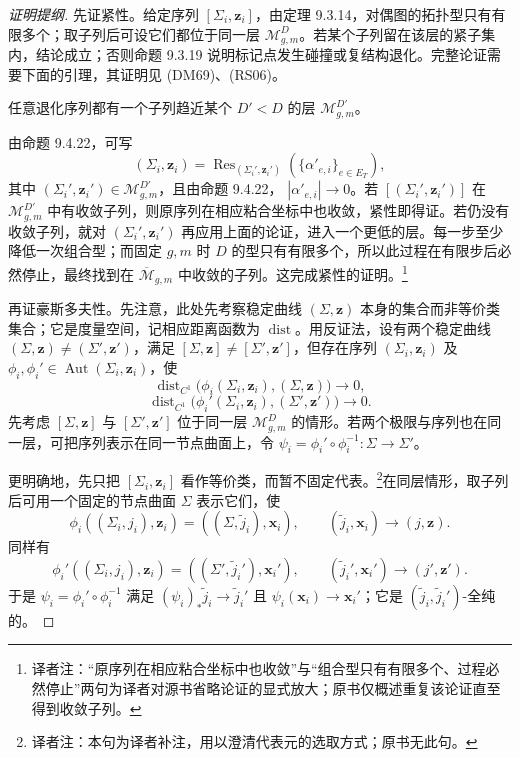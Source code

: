 \begin{proof}[证明提纲]
先证紧性。给定序列 $[\Sigma_i,\boldsymbol z_i]$，由定理 9.3.14，对偶图的拓扑型只有有限多个；取子列后可设它们都位于同一层
$\mathcal M_{g,m}^D$。若某个子列留在该层的紧子集内，结论成立；否则命题 9.3.19 说明标记点发生碰撞或复结构退化。完整论证需要下面的引理，其证明见 (DM69)、(RS06)。

\begin{lemma}\label{lem:degeneration-approaches-lower-stratum}
任意退化序列都有一个子列趋近某个 $D'<D$ 的层
$\mathcal M_{g,m}^{D'}$。
\end{lemma}

由命题 9.4.22，可写
\[
 (\Sigma_i,\boldsymbol z_i)=
 \operatorname{Res}_{(\Sigma_i',\boldsymbol z_i')}
 (\{\alpha'_{e,i}\}_{e\in E_T}),
\]
其中 $(\Sigma_i',\boldsymbol z_i')\in\mathcal M_{g,m}^{D'}$，且由命题 9.4.22，
$|\alpha'_{e,i}|\to0$。若 $[(\Sigma_i',\boldsymbol z_i')]$ 在
$\mathcal M_{g,m}^{D'}$ 中有收敛子列，则原序列在相应粘合坐标中也收敛，紧性即得证。若仍没有收敛子列，就对
$(\Sigma_i',\boldsymbol z_i')$ 再应用上面的论证，进入一个更低的层。每一步至少降低一次组合型；而固定 $g,m$ 时
$D$ 的型只有有限多个，所以此过程在有限步后必然停止，最终找到在
$\overline{\mathcal M}_{g,m}$ 中收敛的子列。这完成紧性的证明。\footnote{译者注：“原序列在相应粘合坐标中也收敛”与“组合型只有有限多个、过程必然停止”两句为译者对源书省略论证的显式放大；原书仅概述重复该论证直至得到收敛子列。}

再证豪斯多夫性。先注意，此处先考察稳定曲线
$(\Sigma,\boldsymbol z)$ 本身的集合而非等价类集合；它是度量空间，记相应距离函数为
$\operatorname{dist}$。用反证法，设有两个稳定曲线
$(\Sigma,\boldsymbol z)\ne(\Sigma',\boldsymbol z')$，满足
$[\Sigma,\boldsymbol z]\ne[\Sigma',\boldsymbol z']$，但存在序列
$(\Sigma_i,\boldsymbol z_i)$ 及
$\phi_i,\phi_i'\in\operatorname{Aut}(\Sigma_i,\boldsymbol z_i)$，使
\[
 \operatorname{dist}_{C^1}\bigl(\phi_i(\Sigma_i,\boldsymbol z_i),
 (\Sigma,\boldsymbol z)\bigr)\longrightarrow0,
\]
\[
 \operatorname{dist}_{C^1}\bigl(\phi_i'(\Sigma_i,\boldsymbol z_i),
 (\Sigma',\boldsymbol z')\bigr)\longrightarrow0.
\]
先考虑 $[\Sigma,\boldsymbol z]$ 与 $[\Sigma',\boldsymbol z']$ 位于同一层
$\mathcal M_{g,m}^D$ 的情形。若两个极限与序列也在同一层，可把序列表示在同一节点曲面上，令
$\psi_i=\phi_i'\circ\phi_i^{-1}:\Sigma\to\Sigma'$。

更明确地，先只把 $[\Sigma_i,\boldsymbol z_i]$ 看作等价类，而暂不固定代表。\footnote{译者注：本句为译者补注，用以澄清代表元的选取方式；原书无此句。}在同层情形，取子列后可用一个固定的节点曲面
$\Sigma$ 表示它们，使
\[
 \phi_i((\Sigma_i,j_i),\boldsymbol z_i)
 =((\Sigma,\widetilde j_i),\boldsymbol x_i),
 \qquad (\widetilde j_i,\boldsymbol x_i)\to(j,\boldsymbol z).
\]
同样有
\[
 \phi_i'((\Sigma_i,j_i),\boldsymbol z_i)
 =((\Sigma',\widetilde j_i'),\boldsymbol x_i'),
 \qquad (\widetilde j_i',\boldsymbol x_i')\to(j',\boldsymbol z').
\]
于是 $\psi_i=\phi_i'\circ\phi_i^{-1}$ 满足
$(\psi_i)_*\widetilde j_i\to\widetilde j_i'$ 且
$\psi_i(\boldsymbol x_i)\to\boldsymbol x_i'$；它是
$(\widetilde j_i,\widetilde j_i')$-全纯的。


\end{proof}
